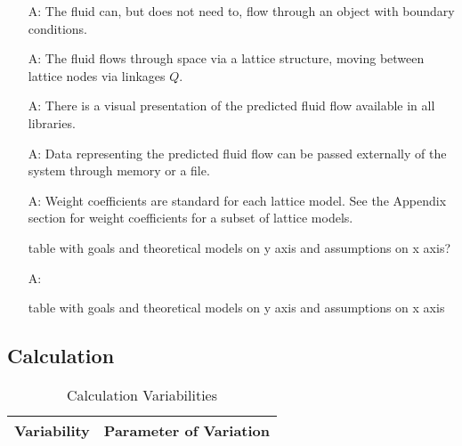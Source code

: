 \documentclass[12pt]{article}
\newcounter{assumpnum} %
\begin{document}
\begin{itemize}

\item[A\refstepcounter{assumpnum}\theassumpnum \label{A_flowObject}:]
  The fluid can, but does not need to, flow through an object with boundary conditions.
  
\item[A\refstepcounter{assumpnum}\theassumpnum \label{A_lattice}:]
  The fluid flows through space via a lattice structure, moving between lattice nodes via linkages $Q$.
  
\item[A\refstepcounter{assumpnum}\theassumpnum \label{A_visualPresentation}:]
  There is a visual presentation of the predicted fluid flow available in all libraries.
  
\item[A\refstepcounter{assumpnum}\theassumpnum \label{A_dataPassed}:]
  Data representing the predicted fluid flow can be passed externally of the system through memory or a file.  
  
\item[A\refstepcounter{assumpnum}\theassumpnum \label{A_weightCoefficients}:]
  Weight coefficients are standard for each lattice model. See the Appendix section for weight coefficients for a subset of lattice models.  

 table with goals and theoretical models on y axis and assumptions on x axis?
\item[A\refstepcounter{assumpnum}\theassumpnum \label{A_meaningfulLabel}:]

 table with goals and theoretical models on y axis and assumptions on x axis

\end{itemize}


\subsection{Calculation} \label{sec_Calculation}

\begin{table}
\begin{center}
\begin{tabular}{| c | c |}
\hline
Variability & Parameter of Variation\\
\hline
\end{tabular}
\caption{Calculation Variabilities}
\end{center}
\end{table}
\end{document}
